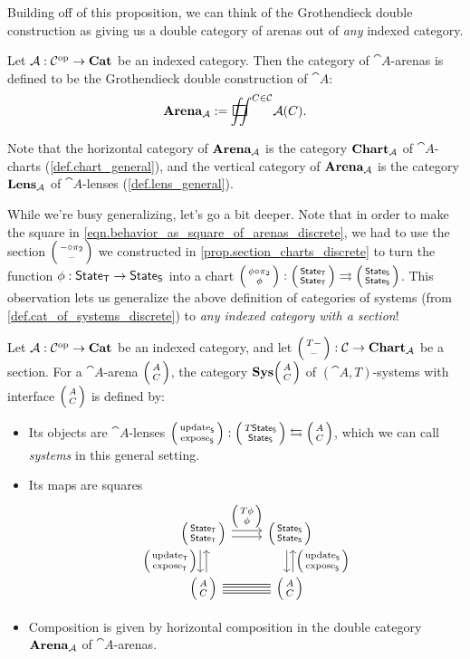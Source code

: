 \documentclass[DynamicalBook]{subfiles}
\begin{document}
Building off of this proposition, we can think of the Grothendieck double
construction as giving us a double category of arenas out of \emph{any} indexed
category.

\begin{definition}\label{def.double_cat_of_arenas_general}
  Let $\mathcal{A} : \mathcal{C}^{\textnormal{op}} \to \textbf{Cat}$ be an indexed category. Then the
  category of $\cat{A}$-arenas is defined to be the Grothendieck double
  construction of $\cat{A}$:
$$\Cat{Arena}_{\cat{A}} := \sqiint^{C \in \cat{C}} \cat{A}(C).$$

  Note that the horizontal category of $\textbf{Arena}_{\mathcal{A}}$ is the category
  $\textbf{Chart}_{\mathcal{A}}$ of $\cat{A}$-charts (\cref{def.chart_general}), and the vertical category of
  $\textbf{Arena}_{\mathcal{A}}$ is the category $\textbf{Lens}_{\mathcal{A}}$ of
  $\cat{A}$-lenses (\cref{def.lens_general}).
\end{definition}

  While we're busy generalizing, let's go a bit deeper. Note that in order to make the square in
  \cref{eqn.behavior_as_square_of_arenas_discrete}, we had to use the section
  $\lens{- \circ \pi_2}{-}$ we constructed in
  \cref{prop.section_charts_discrete} to turn the function $\phi : \mathsf{State}_{\mathsf{T}} \to
  \mathsf{State}_{\mathsf{S}}$ into a chart $\lens{\phi \circ \pi_2}{\phi} :
  \lens{\State{T}}{\State{T}} \tto \lens{\State{S}}{\State{S}}$. This
  observation lets us generalize the above definition of categories of systems
  (from \cref{def.cat_of_systems_discrete})
  to \emph{any indexed category with a section}!
  \begin{definition}
    Let $\mathcal{A} : \mathcal{C}^{\textnormal{op}} \to \textbf{Cat}$ be an indexed category, and let
    $\lens{T-}{-} : \cat{C} \to \Cat{Chart}_{\cat{A}}$ be a section. For a
    $\cat{A}$-arena $\lens{A}{C}$, the category $\Cat{Sys}\lens{A}{C}$ of
    $(\cat{A}, T)$-systems with interface $\lens{A}{C}$ is defined by:
\begin{itemize}
  \item Its objects are $\cat{A}$-lenses $\lens{\update{S}}{\expose{S}} :
    \lens{T\State{S}}{\State{S}} \fromto \lens{A}{C}$, which we can call
    \emph{systems} in this general setting.
  \item Its maps are squares 
\[
    \begin{tikzcd}
      \lens{\State{T}}{\State{T}} \ar[r, shift left, "\lens{T\phi}{\phi}"] \ar[r, shift right] \ar[d, shift right,
      "\lens{\update{T}}{\expose{T}}"'] \ar[d, shift left, leftarrow] &
      \lens{\State{S}}{\State{S}} \ar[d, shift left, leftarrow,
      "\lens{\update{S}}{\expose{S}}"] \ar[d, shift right]\\
      \lens{A}{C} \ar[r, shift right, equals] \ar[r,
      shift left, equals] & \lens{A}{C}
    \end{tikzcd}
\]
\item Composition is given by horizontal composition in the double category
  $\textbf{Arena}_{\mathcal{A}}$ of $\cat{A}$-arenas.
\end{itemize}
  \end{definition}
\end{document}
